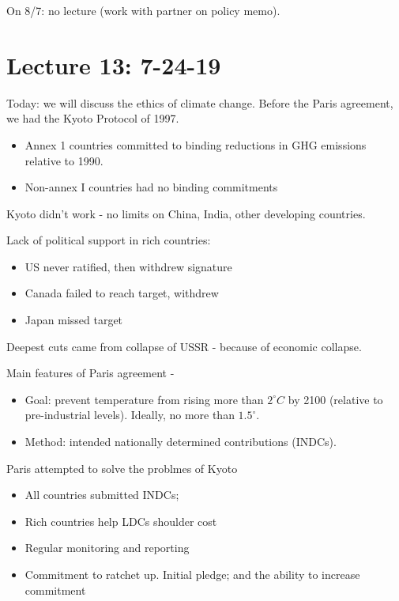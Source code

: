 \documentclass{article}
\begin{document}
  On 8/7: no lecture (work with partner on policy memo).

  \section{Lecture 13: 7-24-19}

  Today: we will discuss the ethics of climate change.  Before the Paris agreement, we had the Kyoto Protocol of 1997.

  \begin{itemize}
    \item Annex 1 countries committed to binding reductions in GHG emissions relative to 1990.
    \item Non-annex I countries had no binding commitments
  \end{itemize}

  Kyoto didn't work - no limits on China, India, other developing countries.

  Lack of political support in rich countries:

  \begin{itemize}
    \item US never ratified, then withdrew signature
    \item Canada failed to reach target, withdrew
    \item Japan missed target
  \end{itemize}

  Deepest cuts came from collapse of USSR - because of economic collapse.

  Main features of Paris agreement - 

  \begin{itemize}
    \item Goal: prevent temperature from rising more than $2^{\circ} C$ by 2100 (relative to pre-industrial levels).  Ideally, no more than $1.5^{\circ}$.
    \item Method: intended nationally determined contributions (INDCs).
  \end{itemize}

  Paris attempted to solve the problmes of Kyoto
  \begin{itemize}
    \item All countries submitted INDCs;
    \item Rich countries help LDCs shoulder cost
    \item Regular monitoring and reporting
    \item Commitment to ratchet up.  Initial pledge; and the ability to increase commitment
  \end{itemize}
\end{document}
